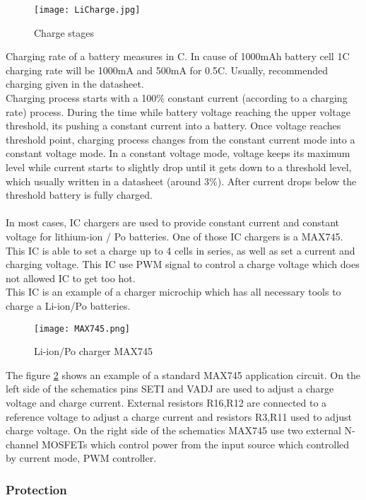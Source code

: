 \begin{figure}[h]
	\centering
	\texttt{[image: LiCharge.jpg]}
	\caption{ Charge stages \cite{14}}
	\label{fig: EPS}
\end{figure}
 Charging rate of a battery measures in C. In cause of 1000mAh battery cell 1C charging rate will be 1000mA and 500mA for 0.5C. Usually, recommended charging given in the datasheet.\\
 Charging process starts with a 100\%  constant current (according to a charging rate) process. During the time while battery voltage reaching the upper voltage threshold, its pushing a constant current into a battery. Once voltage reaches threshold point, charging process changes from the constant current mode into a constant voltage mode. In a constant voltage mode, voltage keeps its maximum level while current starts to slightly drop until it gets down to a threshold level, which usually written in a datasheet (around 3\%). After current drops below the threshold battery is fully charged. \\ \\
 In most cases, IC chargers are used to provide constant current and constant voltage for lithium-ion / Po batteries. \cite{14} One of those IC chargers is a MAX745. 
This IC is able to set a charge up to 4 cells in series, as well as set a current and charging voltage. This IC use PWM signal to control a charge voltage which does not allowed IC to get too hot.\\ This IC is an example of a charger microchip which has all necessary  tools to charge a Li-ion/Po batteries. 



\begin{figure}[h]
	\centering
	\texttt{[image: MAX745.png]}
	\caption{ Li-ion/Po charger MAX745 \cite{15}}
	\label{fig: EPS}
\end{figure}

The figure \ref{fig: EPS} shows an example of a standard MAX745 application circuit. On the left side of the schematics pins SETI and VADJ are used to adjust a charge voltage and charge current. External resistors R16,R12 are connected to a reference voltage to adjust a charge current and resistors R3,R11  used to adjust charge voltage. On the right side of the schematics MAX745 use two external N-channel MOSFETs which control power from the input source which controlled by current mode, PWM controller. 



\subsubsection{Protection}

